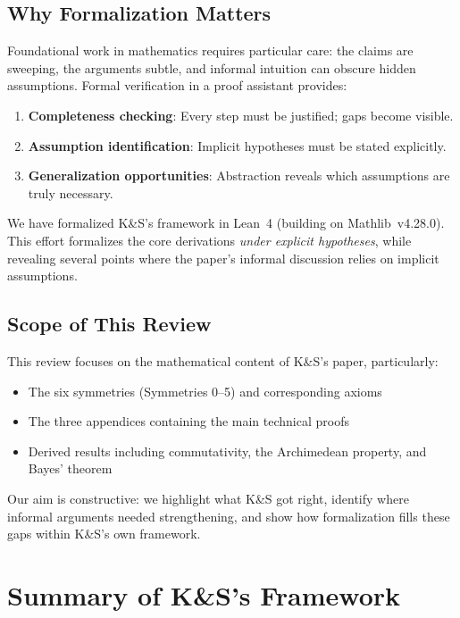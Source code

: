 \documentclass[11pt]{article}
\begin{document}
\subsection{Why Formalization Matters}

Foundational work in mathematics requires particular care: the claims are sweeping,
the arguments subtle, and informal intuition can obscure hidden assumptions.
Formal verification in a proof assistant provides:
\begin{enumerate}[noitemsep]
\item \textbf{Completeness checking}: Every step must be justified; gaps become visible.
\item \textbf{Assumption identification}: Implicit hypotheses must be stated explicitly.
\item \textbf{Generalization opportunities}: Abstraction reveals which assumptions are truly necessary.
\end{enumerate}

We have formalized K\&S's framework in Lean~4 (building on Mathlib~v4.28.0).
This effort formalizes the core derivations \emph{under explicit hypotheses}, while revealing
several points where the paper's informal discussion relies on implicit assumptions.

\subsection{Scope of This Review}

This review focuses on the mathematical content of K\&S's paper, particularly:
\begin{itemize}[noitemsep]
\item The six symmetries (Symmetries 0--5) and corresponding axioms
\item The three appendices containing the main technical proofs
\item Derived results including commutativity, the Archimedean property, and Bayes' theorem
\end{itemize}

Our aim is constructive: we highlight what K\&S got right, identify where informal
arguments needed strengthening, and show how formalization fills these gaps within
K\&S's own framework.

\clearpage

\section{Summary of K\&S's Framework}
\end{document}
